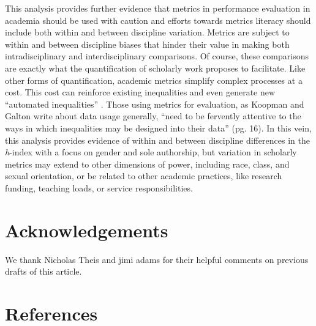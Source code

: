 \documentclass[
  10pt,
  letterpaper,
]{article}
\begin{document}
This analysis provides further evidence that metrics in performance
evaluation in academia should be used with caution and efforts towards
metrics literacy should include both within and between discipline
variation. Metrics are subject to within and between discipline biases
that hinder their value in making both intradisciplinary and
interdisciplinary comparisons. Of course, these comparisons are exactly
what the quantification of scholarly work proposes to facilitate. Like
other forms of quantification, academic metrics simplify complex
processes at a cost. This cost can reinforce existing inequalities and
even generate new ``automated inequalities''
\citep{eubanks_automating_2018}. Those using metrics for evaluation, as
Koopman and Galton \citep{koopman_galton_2023} write about data usage
generally, ``need to be fervently attentive to the ways in which
inequalities may be designed into their data'' (pg. 16). In this vein,
this analysis provides evidence of within and between discipline
differences in the \emph{h}-index with a focus on gender and sole
authorship, but variation in scholarly metrics may extend to other
dimensions of power, including race, class, and sexual orientation, or
be related to other academic practices, like research funding, teaching
loads, or service responsibilities.

\section{Acknowledgements}\label{acknowledgements}

We thank Nicholas Theis and jimi adams for their helpful comments on
previous drafts of this article.

\section{References}\label{references}
\end{document}
